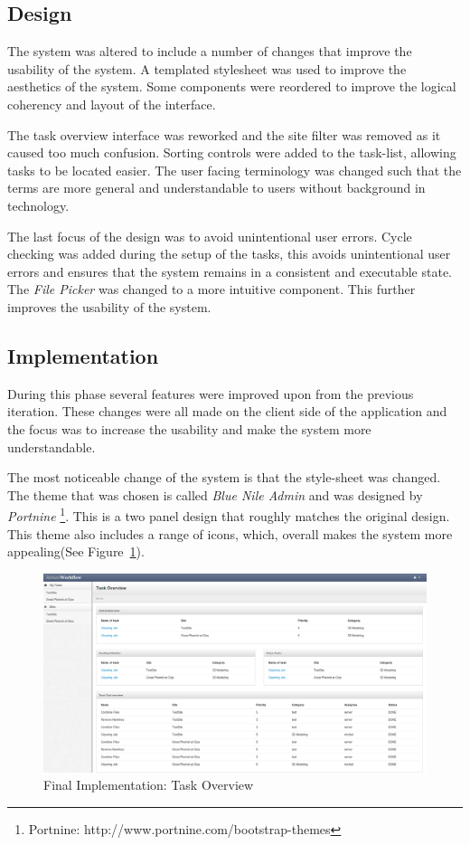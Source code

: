 \subsection{Design}
The system was altered to include a number of changes that improve the usability of the system.
A templated stylesheet was used to improve the aesthetics of the system. Some components were reordered
to improve the logical coherency and layout of the interface.

The task overview interface was reworked and the site filter was removed as it caused too
much confusion. Sorting controls were added to the task-list, allowing tasks to be located
easier. The user facing terminology was changed such that the terms are more general
and understandable to users without background in technology.

The last focus of the design was to avoid unintentional user errors.
Cycle checking was added during the setup of the tasks, this avoids unintentional user errors
and ensures that the system remains in a consistent and executable state. The \emph{File Picker}
was changed to a more intuitive component. This further improves the usability of the system.

\subsection{Implementation}

During this phase several features were improved upon from the previous iteration.
These changes were all made on the client side of the application and the focus was
to increase the usability and make the system more understandable.

The most noticeable change of the system is that the style-sheet was changed. The theme that
was chosen is called  \emph{Blue Nile Admin} and was designed by \emph{Portnine}
\footnote{Portnine: http://www.portnine.com/bootstrap-themes}. This is a two panel design
that roughly matches the original design. This theme also includes a range of icons, which,
overall makes the system more appealing(See Figure~\ref{final:overview}).

\begin{figure}[!h]
    \begin{center}
        \includegraphics[scale=0.22]{figures/final-overview.png}
    \end{center}
    \caption{Final Implementation: Task Overview}
    \label{final:overview}
\end{figure}

